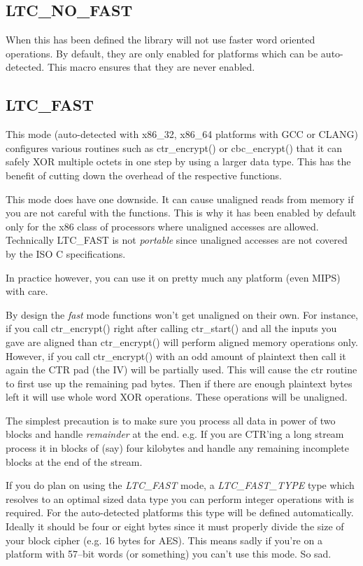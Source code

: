 \documentclass[synpaper]{book}
\begin{document}
\subsection{LTC\_NO\_FAST}
When this has been defined the library will not use faster word oriented operations.  By default, they are only enabled for platforms
which can be auto-detected.  This macro ensures that they are never enabled.

\subsection{LTC\_FAST}
This mode (auto-detected with x86\_32, x86\_64 platforms with GCC or CLANG) configures various routines such as ctr\_encrypt() or 
cbc\_encrypt() that it can safely XOR multiple octets in one step by using a larger data type.  This has the benefit of 
cutting down the overhead of the respective functions.  

This mode does have one downside.  It can cause unaligned reads from memory if you are not careful with the functions.  This is why
it has been enabled by default only for the x86 class of processors where unaligned accesses are allowed.  Technically LTC\_FAST
is not \textit{portable} since unaligned accesses are not covered by the ISO C specifications.

In practice however, you can use it on pretty much any platform (even MIPS) with care.

By design the \textit{fast} mode functions won't get unaligned on their own.  For instance, if you call ctr\_encrypt() right after calling
ctr\_start() and all the inputs you gave are aligned than ctr\_encrypt() will perform aligned memory operations only.  However, if you 
call ctr\_encrypt() with an odd amount of plaintext then call it again the CTR pad (the IV) will be partially used.  This will
cause the ctr routine to first use up the remaining pad bytes.  Then if there are enough plaintext bytes left it will use 
whole word XOR operations.  These operations will be unaligned.

The simplest precaution is to make sure you process all data in power of two blocks and handle \textit{remainder} at the end.  e.g. If you are 
CTR'ing a long stream process it in blocks of (say) four kilobytes and handle any remaining incomplete blocks at the end of the stream.  

If you do plan on using the \textit{LTC\_FAST} mode, a \textit{LTC\_FAST\_TYPE} type which resolves to an optimal sized
data type you can perform integer operations with is required.  For the auto-detected platforms this type will be defined automatically.  Ideally it should be four or eight bytes since it must properly divide the size 
of your block cipher (e.g. 16 bytes for AES).  This means sadly if you're on a platform with 57--bit words (or something) you can't 
use this mode.  So sad.
\end{document}
